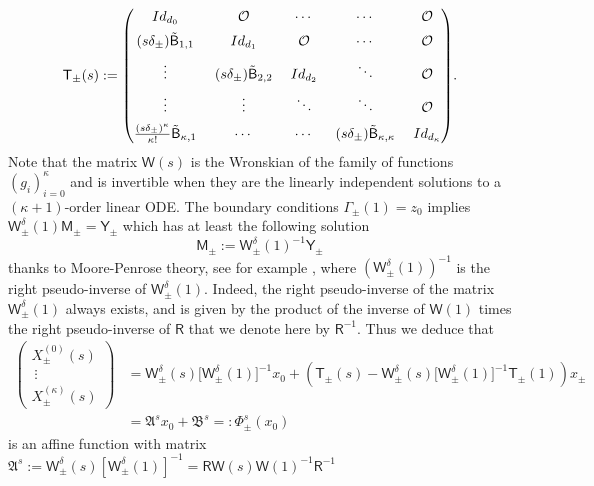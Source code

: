 \documentclass[10pt,a4paper]{amsart}
\theoremstyle{definition}
\newcommand{\sB}{{\mathsf B}}
\newcommand{\sW}{{\mathsf W}}
\newcommand{\sT}{{\mathsf T}}
\newcommand{\I}{\textup{Id}}\let\Id\I
\begin{document}
\begin{align}
\sT_\pm (s) :=\arraycolsep6.5pt \begin{pmatrix}
\I_{d_0} & \OO & \cdots & \cdots & \OO \\[5pt]
(s\delta_\pm) \tilde \sB_{1,1} & \Id_{d_1} & \OO & \cdots & \OO \\[5pt]
\vdots & (s \delta_\pm) \tilde \sB_{2,2} & \Id_{d_2} & \ddots & \OO \\[5pt]
\vdots & \vdots & \ddots & \ddots & \OO \\[5pt]
\frac{(s\delta_\pm)^\kappa}{\kappa!} \tilde \sB_{\kappa,1} &
\cdots & \cdots & (s \delta_\pm) \tilde \sB_{\kappa,\kappa} & \Id_{d_\kappa}
\end{pmatrix}\!.
\end{align}
Note that the matrix $\sW(s)$ is the Wronskian of the family of
functions $(g_i)_{i=0} ^\kappa$ and is invertible when they are
the linearly independent solutions to a $(\kappa+1)$-order linear
ODE. The boundary conditions $\Gamma_\pm(1)=z_0$ implies
$
\sW_\pm ^\delta (1) \mathsf M_\pm = \mathsf Y_\pm $ which has at least the following solution
\begin{equation*}
\mathsf M_\pm := \sW_\pm ^\delta (1)^{-1}\mathsf Y_\pm
\end{equation*}
thanks to Moore-Penrose theory, see for example \cite{Barata-Hussein}, where $(\sW_\pm ^\delta (1))^{-1}$ is the right pseudo-inverse of $\sW_\pm ^\delta (1)$.
Indeed, the right pseudo-inverse of the matrix $\sW_\pm ^\delta (1)$ always exists, and is given by the product of the inverse of $\sW(1)$ times the right pseudo-inverse of $\mathsf R$ that we denote here by ${\mathsf R}^{-1}$.
Thus we deduce that
\begin{equation}\label{eq:mapping}
\begin{aligned}
\begin{pmatrix}
X^{(0)}_\pm (s) \\\
\vdots \\
X^{(\kappa)}_\pm (s)
\end{pmatrix}
&= \sW_\pm ^\delta (s) \big[\sW_\pm ^\delta
(1)\big]^{-1} x_0
+ \left(\sT_{\pm} (s) - \sW_\pm ^\delta (s) \big[\sW_\pm ^\delta
(1)\big]^{-1} \sT_{\pm} (1) \right) x_\pm \\
& = \mathfrak A^s x_0 + \mathfrak B^s =: \Phi^s_\pm (x_0)
\end{aligned}
\end{equation}
is an affine function with matrix
$\mathfrak A^s:=\sW_\pm ^\delta (s) [\sW_\pm ^\delta (1)]^{-1} = \mathsf R \mathsf W (s) \mathsf W(1)^{-1} \mathsf R^{-1}$
\end{document}
